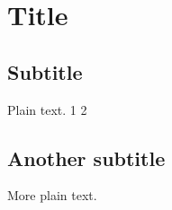 \documentclass{article}
\begin{document}
\section{Title}

\subsection{Subtitle}

Plain text.
1
2

\subsection{Another subtitle}

More plain text.
\end{document}
